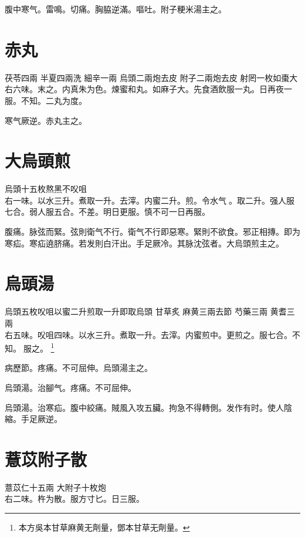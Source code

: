 腹中寒气。雷鳴。切痛。胸脇逆滿。嘔吐。附子粳米湯主之。

\section{赤丸}

茯苓{\scriptsize 四兩} 半夏{\scriptsize 四兩洗} 細辛{\scriptsize 一兩} 烏頭{\scriptsize 二兩炮去皮} 附子{\scriptsize 二兩炮去皮} 射罔{\scriptsize 一枚如棗大}\\
右六味。末之。内真朱为色。煉蜜和丸。如麻子大。先食酒飲服一丸。日再夜一服。不知。二丸为度。

寒气厥逆。赤丸主之。

\section{大烏頭煎}

烏頭{\scriptsize 十五枚熬黑不㕮咀}\\
右一味。以水三升。煮取一升。去滓。内蜜二升。煎。令水气{\sungtpii 𥁞}。取二升。强人服七合。弱人服五合。不差。明日更服。慎不可一日再服。

腹痛。脉弦而緊。弦則衛气不行。{\khaaitp 衛气不行}即惡寒。緊則不欲食。邪正相摶。即为寒疝。寒疝遶脐痛。若发則白汗出。手足厥冷。其脉沈弦者。大烏頭煎主之。

\section{烏頭湯}

烏頭{\scriptsize 五枚㕮咀以蜜二升煎取一升即取烏頭} 甘草{\scriptsize 炙} 麻黄{\scriptsize 三兩去節} 芍藥{\scriptsize 三兩} 黄耆{\scriptsize 三兩}\\
右五味。㕮咀四味。以水三升。煮取一升。去滓。内蜜煎中。更煎之。服七合。不知。{\sungtpii 𥁞}服之。
\footnote{本方吳本甘草麻黄无劑量，鄧本甘草无劑量。}

病歷節。疼痛。不可屈伸。烏頭湯主之。

烏頭湯。治腳气。疼痛。不可屈伸。

烏頭湯。治寒疝。腹中絞痛。賊風入攻五臟。拘急不得轉側。发作有时。使人陰縮。手足厥逆。

\section{薏苡附子散}

薏苡仁{\scriptsize 十五兩} 大附子{\scriptsize 十枚炮}\\
右二味。杵为散。服方寸匕。日三服。

